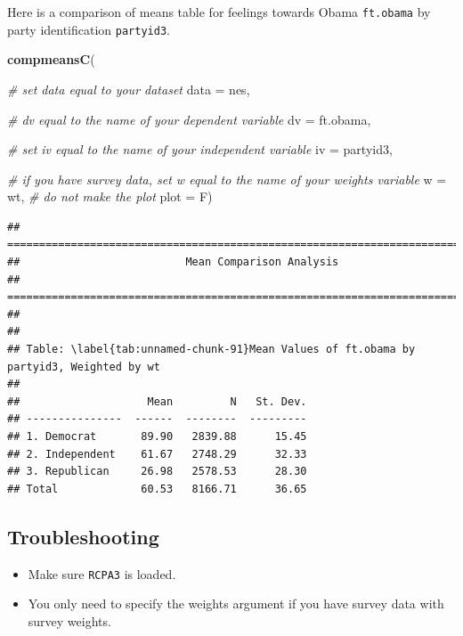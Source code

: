 \documentclass[
]{book}
\newenvironment{Shaded}{\begin{snugshade}}{\end{snugshade}}
\newcommand{\AttributeTok}[1]{\textcolor[rgb]{0.13,0.29,0.53}{#1}}
\newcommand{\CommentTok}[1]{\textcolor[rgb]{0.56,0.35,0.01}{\textit{#1}}}
\newcommand{\FunctionTok}[1]{\textcolor[rgb]{0.13,0.29,0.53}{\textbf{#1}}}
\newcommand{\NormalTok}[1]{#1}
\providecommand{\tightlist}{%
  \setlength{\itemsep}{0pt}\setlength{\parskip}{0pt}}
\begin{document}
Here is a comparison of means table for feelings towards Obama \texttt{ft.obama} by party identification \texttt{partyid3}.

\begin{Shaded}
\begin{Highlighting}[]
\FunctionTok{compmeansC}\NormalTok{(}
  
  \CommentTok{\# set \textasciigrave{}data\textasciigrave{} equal to your dataset}
  \AttributeTok{data =}\NormalTok{ nes,}
  
  \CommentTok{\# \textasciigrave{}dv\textasciigrave{} equal to the name of your dependent variable}
  \AttributeTok{dv =}\NormalTok{ ft.obama, }
  
  \CommentTok{\# set \textasciigrave{}iv\textasciigrave{} equal to the name of your independent variable}
  \AttributeTok{iv =}\NormalTok{ partyid3, }
  
  \CommentTok{\# if you have survey data, set \textasciigrave{}w\textasciigrave{} equal to the name of your weights variable}
  \AttributeTok{w =}\NormalTok{ wt,}
  \CommentTok{\# do not make the plot}
  \AttributeTok{plot =}\NormalTok{ F)}
\end{Highlighting}
\end{Shaded}

\begin{verbatim}
## ===========================================================================
##                          Mean Comparison Analysis
## ===========================================================================
## 
## 
## Table: \label{tab:unnamed-chunk-91}Mean Values of ft.obama by partyid3, Weighted by wt
## 
##                    Mean         N   St. Dev.
## ---------------  ------  --------  ---------
## 1. Democrat       89.90   2839.88      15.45
## 2. Independent    61.67   2748.29      32.33
## 3. Republican     26.98   2578.53      28.30
## Total             60.53   8166.71      36.65
\end{verbatim}

\hypertarget{troubleshooting-35}{%
\subsection{Troubleshooting}\label{troubleshooting-35}}

\begin{itemize}
\tightlist
\item
  Make sure \texttt{RCPA3} is loaded.
\item
  You only need to specify the weights argument if you have survey data with survey weights.
\end{itemize}
\end{document}
